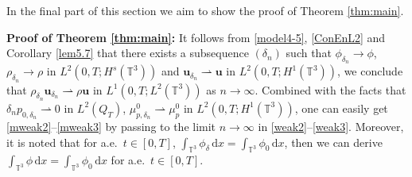 \documentclass[reqno,a4paper,11pt]{amsart}
\theoremstyle{plain}
\numberwithin{equation}{section}
\begin{document}
								
								
								
								
								
								In the final part of this section we aim to show the proof of  Theorem \ref{thm:main}.
								
								{\bf Proof of Theorem \ref{thm:main}:}
								It follows from  \eqref{model4-5}, \eqref{ConEnL2} and Corollary \ref{lem5.7} that there exists a subsequence $(\delta_n)$ such that $\phi_{\delta_n}\rightarrow\phi$, $\rho_{\delta_n}\rightarrow\rho$ in $L^{2}(0,T;H^{s}(\mathbb{T}^{3}))$ and  $\mathbf{u}_{\delta_n}\rightharpoonup \mathbf{u}$ in $L^{2}(0,T;H^{1}(\mathbb{T}^{3}))$, we conclude that
								$\rho_{\delta_n}\mathbf{u}_{\delta_n}\rightharpoonup \rho\mathbf{u}$ in $L^{1}(0,T;L^{2}(\mathbb{T}^{3}))$ as $n\rightarrow\infty$. Combined with the facts that $\delta_n p_{0,\delta_n}\rightharpoonup 0$ in $L^{2}(Q_{T})$, $\mu_{p,\delta_n}^{0}\rightharpoonup \mu_{p}^{0}$ in $L^{2}(0,T;H^{1}(\mathbb{T}^{3}))$, one can easily get
								\eqref{mweak2}--\eqref{mweak3}  by passing to the limit $n\rightarrow\infty$ in \eqref{weak2}--\eqref{weak3}. Moreover, it is noted that for a.e.~$t \in [0,T]$,  $\int_{\mathbb{T}^{3}}\phi_{\delta}\, \mathrm{d} x=\int_{\mathbb{T}^{3}}\phi_0\, \mathrm{d} x$, then we can derive $\int_{\mathbb{T}^{3}}\phi\, \mathrm{d} x=\int_{\mathbb{T}^{3}}\phi_0\, \mathrm{d} x$ for a.e.~$t \in [0,T]$.
							
\end{document}
